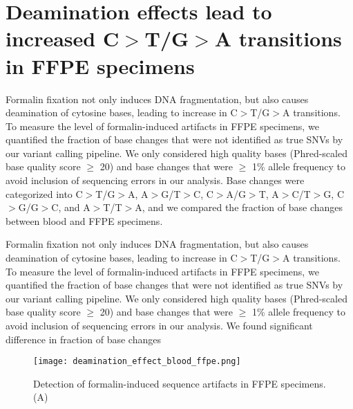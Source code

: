 \section{Deamination effects lead to increased C$>$T/G$>$A transitions in FFPE specimens}
\label{sec:DeaminationeffectsleadtoincreasedC$>$T/G$>$AtransitionsatlowallelefrequencyinFFPEspecimens}

Formalin fixation not only induces DNA fragmentation, but also causes deamination of cytosine bases, leading to increase in C$>$T/G$>$A transitions. To measure the level of formalin-induced artifacts in FFPE specimens, we quantified the fraction of base changes that were not identified as true SNVs by our variant calling pipeline. We only considered high quality bases (Phred-scaled base quality score $\geq$ 20) and base changes that were $\geq$ 1\% allele frequency to avoid inclusion of sequencing errors in our analysis. Base changes were categorized into C$>$T/G$>$A, A$>$G/T$>$C, C$>$A/G$>$T, A$>$C/T$>$G, C$>$G/G$>$C, and A$>$T/T$>$A, and we compared the fraction of base changes between blood and FFPE specimens.

Formalin fixation not only induces DNA fragmentation, but also causes deamination of cytosine bases, leading to increase in C$>$T/G$>$A transitions. To measure the level of formalin-induced artifacts in FFPE specimens, we quantified the fraction of base changes that were not identified as true SNVs by our variant calling pipeline. We only considered high quality bases (Phred-scaled base quality score $\geq$ 20) and base changes that were $\geq$ 1\% allele frequency to avoid inclusion of sequencing errors in our analysis. We found significant difference in fraction of base changes


\begin{figure}[H]
	\centering
	\texttt{[image: deamination\_effect\_blood\_ffpe.png]}
	\caption{Detection of formalin-induced sequence artifacts in FFPE specimens. (A) }
	\label{fig:deamination_effect_blood_ffpe}
\end{figure}


